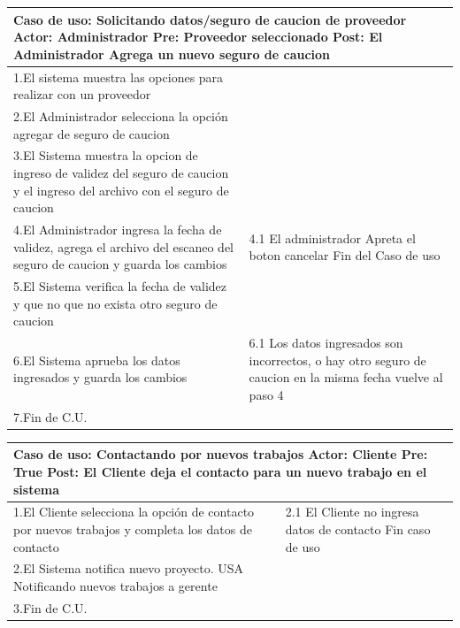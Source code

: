 \begin{longtable}{|p{}|p{}|}
    \hline
    \multicolumn{2}{|p{16cm}|}{
        \textbf{Caso de uso:} Solicitando datos/seguro de caucion de proveedor\newline
        \textbf{Actor:} Administrador\newline
        \textbf{Pre:} Proveedor seleccionado\newline
        \textbf{Post:} El Administrador Agrega un nuevo seguro de caucion
    }\\
    \hline
    1.El sistema  muestra las opciones para realizar con un proveedor & \\
    \hline
    2.El Administrador selecciona la opción agregar de seguro de caucion& \\
    \hline
    3.El Sistema muestra la opcion de ingreso de validez del seguro de caucion y el ingreso del archivo con el seguro de caucion&  \\
    \hline
    4.El Administrador ingresa la fecha de validez, agrega el archivo del escaneo del seguro de caucion y guarda los cambios&4.1 El administrador Apreta el boton cancelar \newline 4.2 Fin del Caso de uso \\
    \hline
    5.El Sistema verifica la fecha de validez y que no que no exista otro seguro de caucion & \\
    \hline
    6.El Sistema aprueba los datos ingresados y guarda los cambios &6.1 Los datos ingresados son incorrectos, o hay otro seguro de caucion en la misma fecha  \newline 6.2 vuelve al paso 4\\
    \hline
    7.Fin de C.U.& \\
    \hline
\end{longtable}



\begin{longtable}{|p{}|p{}|}
    \hline
    \multicolumn{2}{|p{16cm}|}{
        \textbf{Caso de uso:} Contactando por nuevos trabajos\newline
        \textbf{Actor:} Cliente\newline
        \textbf{Pre: }  True\newline
        \textbf{Post:} El Cliente deja el contacto para un nuevo trabajo en el sistema
    }\\
    \hline
    1.El Cliente selecciona la opción de contacto por nuevos trabajos y completa los datos de contacto&2.1 El Cliente no ingresa datos de contacto\newline 1.2 Fin caso de uso   \\
    \hline
    2.El Sistema notifica nuevo proyecto. USA Notificando nuevos trabajos a gerente& \\
    \hline
    3.Fin de C.U.& \\
    \hline
\end{longtable}


